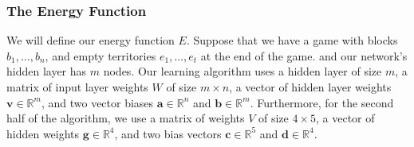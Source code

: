 \documentclass[11pt,letterpaper]{article}
\begin{document}
\subsubsection{The Energy Function}

\def\v#1{\mathbf{#1}}
\def\touches#1#2{\mbox{tchs}_{#1}{\left(#2\right)}}
\def\color#1{\mbox{clr}{\left(#1\right)}}
\def\colorp#1{\mbox{clr}^*{\left(#1\right)}}
\def\size#1{\mbox{size}{\left(#1\right)}}

We will define our energy function $E$. Suppose that we have a game with blocks $b_1, \ldots, b_n$, and empty
territories $e_1, \ldots, e_t$ at the end of the game.  and our network's hidden layer has $m$ nodes. Our learning
algorithm uses a hidden layer of size $m$, a matrix of input layer weights $W$ of size $m \times n$, a vector of
hidden layer weights $\v{ v } \in \mathbb{ R }^m$, and two vector biases $\v{ a } \in \mathbb{ R }^n$ and
$\v{ b } \in \mathbb{ R }^m$. Furthermore, for the second half of the algorithm, we use a matrix of weights $V$ of size
$4 \times 5$, a vector of hidden weights $\v{ g } \in \mathbb{ R }^4$, and two bias vectors $\v{ c } \in \mathbb{ R }^5$
and $\v{ d } \in \mathbb{ R }^4$.
\end{document}
